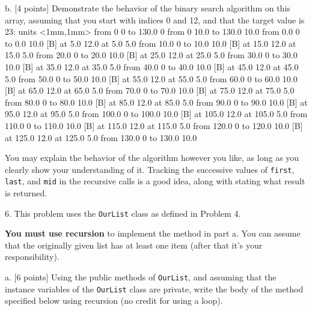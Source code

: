 \item{b.} [4 points]
Demonstrate the behavior of the binary search algorithm on this array,
assuming that you start with indices 0 and 12, and that the target value is 23:
\medskip
\beginpicture
\setcoordinatesystem units <1mm,1mm>
\putrule from 0 0 to 130.0 0
\putrule from 0 10.0 to 130.0 10.0
\putrule from 0.0 0 to 0.0 10.0
 [B] at 5.0 12.0
 at 5.0 5.0
\putrule from 10.0 0 to 10.0 10.0
 [B] at 15.0 12.0
 at 15.0 5.0
\putrule from 20.0 0 to 20.0 10.0
 [B] at 25.0 12.0
 at 25.0 5.0
\putrule from 30.0 0 to 30.0 10.0
 [B] at 35.0 12.0
 at 35.0 5.0
\putrule from 40.0 0 to 40.0 10.0
 [B] at 45.0 12.0
 at 45.0 5.0
\putrule from 50.0 0 to 50.0 10.0
 [B] at 55.0 12.0
 at 55.0 5.0
\putrule from 60.0 0 to 60.0 10.0
 [B] at 65.0 12.0
 at 65.0 5.0
\putrule from 70.0 0 to 70.0 10.0
 [B] at 75.0 12.0
 at 75.0 5.0
\putrule from 80.0 0 to 80.0 10.0
 [B] at 85.0 12.0
 at 85.0 5.0
\putrule from 90.0 0 to 90.0 10.0
 [B] at 95.0 12.0
 at 95.0 5.0
\putrule from 100.0 0 to 100.0 10.0
 [B] at 105.0 12.0
 at 105.0 5.0
\putrule from 110.0 0 to 110.0 10.0
 [B] at 115.0 12.0
 at 115.0 5.0
\putrule from 120.0 0 to 120.0 10.0
 [B] at 125.0 12.0
 at 125.0 5.0
\putrule from 130.0 0 to 130.0 10.0
\endpicture
\medskip
\medskip

You may explain the behavior of the algorithm however you like, as long as you clearly show your understanding of it.  Tracking the successive values of {\tt first}, {\tt last}, and {\tt mid} in the
recursive calls is a good idea, along with stating what result is returned.
\vfil
\vfil
\vfil
\vfil
\vfil
\vfil

\newtestpage{\courselabel}{\testlabel}{}
\item{6.}
This problem uses the {\tt OurList} class as defined in Problem 4.
\medskip

{\bf You must use recursion\/} to implement the method in part a.
You can assume that the originally given list
has at least one item (after that it's your responsibility).
\medskip

\item{a.} [6 points]
Using the public methods of {\tt OurList}, and assuming that the instance variables of the
{\tt OurList} class are private, write the body of the method specified below using 
recursion (no credit for using a loop).
\medskip

